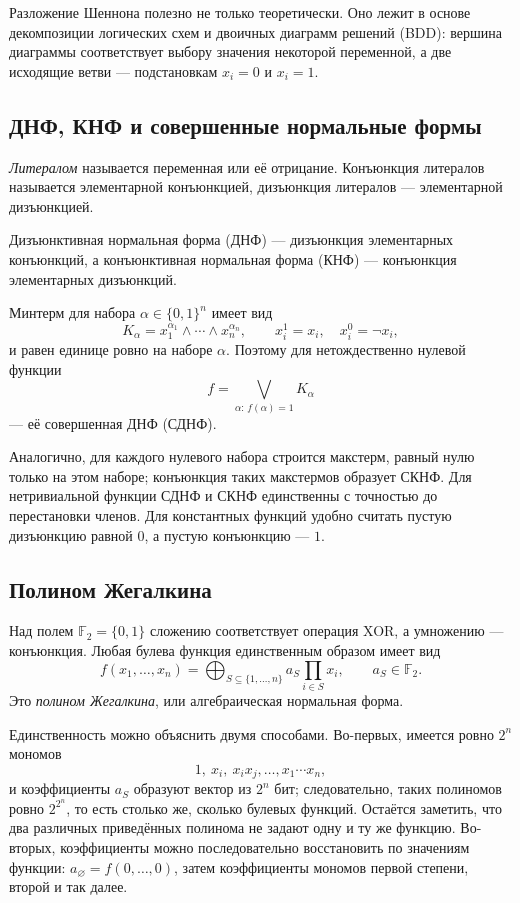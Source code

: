 Разложение Шеннона полезно не только теоретически. Оно лежит в основе
декомпозиции логических схем и двоичных диаграмм решений (BDD): вершина диаграммы
соответствует выбору значения некоторой переменной, а две исходящие ветви ---
подстановкам $x_i=0$ и $x_i=1$.

\subsection{ДНФ, КНФ и совершенные нормальные формы}

\emph{Литералом} называется переменная или её отрицание. Конъюнкция литералов
называется элементарной конъюнкцией, дизъюнкция литералов --- элементарной
дизъюнкцией.

Дизъюнктивная нормальная форма (ДНФ) --- дизъюнкция элементарных конъюнкций,
а конъюнктивная нормальная форма (КНФ) --- конъюнкция элементарных дизъюнкций.

Минтерм для набора $\alpha\in\{0,1\}^n$ имеет вид
\[
 K_\alpha=x_1^{\alpha_1}\land\cdots\land x_n^{\alpha_n},
 \qquad
 x_i^1=x_i,\quad x_i^0=\neg x_i,
\]
и равен единице ровно на наборе $\alpha$. Поэтому для нетождественно нулевой
функции
\[
 f=\bigvee_{\alpha:\,f(\alpha)=1}K_\alpha
\]
--- её совершенная ДНФ (СДНФ).

Аналогично, для каждого нулевого набора строится макстерм, равный нулю только на
этом наборе; конъюнкция таких макстермов образует СКНФ. Для нетривиальной функции
СДНФ и СКНФ единственны с точностью до перестановки членов. Для константных
функций удобно считать пустую дизъюнкцию равной $0$, а пустую конъюнкцию --- $1$.

\subsection{Полином Жегалкина}

Над полем $\mathbb F_2=\{0,1\}$ сложению соответствует операция XOR, а
умножению --- конъюнкция. Любая булева функция единственным образом имеет вид
\[
 f(x_1,\ldots,x_n)=
 \bigoplus_{S\subseteq\{1,\ldots,n\}}
 a_S\prod_{i\in S}x_i,
 \qquad a_S\in\mathbb F_2.
\]
Это \emph{полином Жегалкина}, или алгебраическая нормальная форма.

Единственность можно объяснить двумя способами.
Во-первых, имеется ровно $2^n$ мономов
\[
 1,\ x_i,\ x_ix_j,\ldots,x_1\cdots x_n,
\]
и коэффициенты $a_S$ образуют вектор из $2^n$ бит; следовательно, таких полиномов
ровно $2^{2^n}$, то есть столько же, сколько булевых функций. Остаётся заметить,
что два различных приведённых полинома не задают одну и ту же функцию.
Во-вторых, коэффициенты можно последовательно восстановить по значениям функции:
$a_\varnothing=f(0,\ldots,0)$, затем коэффициенты мономов первой степени, второй
и так далее.


